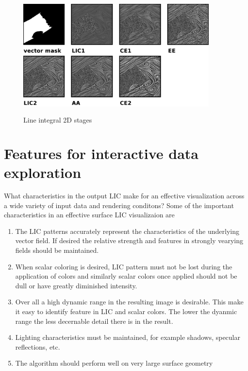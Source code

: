 \documentclass[a4paper,10pt]{article}
\begin{document}
\begin{figure}[ht]
	\centering
	\includegraphics[width=0.9\textwidth]{./images-data/dia-serial/lg-lic2d-200ppi.png}
	\label{fig:lic2d-outputs}
  \caption{Line integral 2D stages}
\end{figure}


\FloatBarrier



\section{Features for interactive data exploration}

What characteristics in the output LIC make for an effective visualization across a wide variety of input data and rendering conditons? Some of the important characteristics in an effective surface LIC visualizaion are
\begin{enumerate}
 \item The LIC patterns accurately represent the characteristics of the underlying vector field. If desired the relative strength and features in strongly vearying fields should be maintained.
 \item When scalar coloring is desired, LIC pattern must not be lost during the application of colors and similarly scalar colors once applied should not be dull or have greatly diminished intensity.
 \item Over all a high dynamic range in the resulting image is desirable. This make it easy to identify feature in LIC and scalar colors. The lower the dyanmic range the less decernable detail there is in the result.
 \item Lighting characteristics must be maintained, for example shadows, specular reflections, etc.
 \item The algorithm should perform well on very large surface geometry
\end{enumerate}
\end{document}
